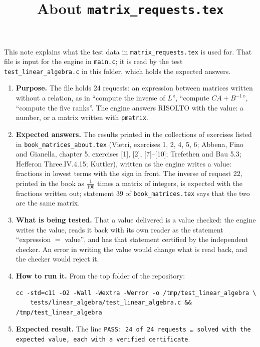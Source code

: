 \documentclass[11pt,a4paper]{article}
\title{About \texttt{matrix\_requests.tex}}
\author{}
\date{}
\begin{document}
\maketitle
This note explains what the test data in \texttt{matrix\_requests.tex} is used for. That file is input for the engine in \texttt{main.c}; it is read by the test \texttt{test\_linear\_algebra.c} in this folder, which holds the expected answers.

\begin{enumerate}
\item \textbf{Purpose.} The file holds 24 requests: an expression between matrices written without a relation, as in ``compute the inverse of $L$'', ``compute $CA + B^{-1}$'', ``compute the five ranks''. The engine answers RISOLTO with the value: a number, or a matrix written with \texttt{pmatrix}.

\item \textbf{Expected answers.} The results printed in the collections of exercises listed in \texttt{book\_matrices\_about.tex} (Vietri, exercises 1, 2, 4, 5, 6; Abbena, Fino and Gianella, chapter 5, exercises [1], [2], [7]--[10]; Trefethen and Bau 5.3; Hefferon Three.IV.4.15; Kuttler), written as the engine writes a value: fractions in lowest terms with the sign in front. The inverse of request 22, printed in the book as $\frac{1}{100}$ times a matrix of integers, is expected with the fractions written out; statement 39 of \texttt{book\_matrices.tex} says that the two are the same matrix.

\item \textbf{What is being tested.} That a value delivered is a value checked: the engine writes the value, reads it back with its own reader as the statement ``expression $=$ value'', and has that statement certified by the independent checker. An error in writing the value would change what is read back, and the checker would reject it.

\item \textbf{How to run it.} From the top folder of the repository:
\begin{verbatim}
cc -std=c11 -O2 -Wall -Wextra -Werror -o /tmp/test_linear_algebra \
    tests/linear_algebra/test_linear_algebra.c && /tmp/test_linear_algebra
\end{verbatim}

\item \textbf{Expected result.} The line \texttt{PASS: 24 of 24 requests \dots{} solved with the expected value, each with a verified certificate}.
\end{enumerate}
\end{document}
